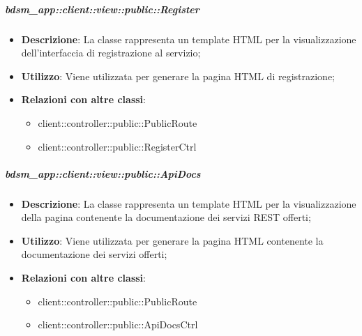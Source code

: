 		\subparagraph{bdsm\_app::client::view::public::Register} %
		\label{subp:bdsm_app_client_view_public_register}
			\begin{itemize}
				\item \textbf{Descrizione}: La classe rappresenta un template HTML per la visualizzazione dell'interfaccia di registrazione al servizio;
				\item \textbf{Utilizzo}: Viene utilizzata per generare la pagina HTML di registrazione;
				\item \textbf{Relazioni con altre classi}:
					\begin{itemize}
						\item client::controller::public::PublicRoute
						\item client::controller::public::RegisterCtrl
					\end{itemize}
			\end{itemize}

		\subparagraph{bdsm\_app::client::view::public::ApiDocs} %
		\label{subp:bdsm_app_client_view_public_apidocs}
			\begin{itemize}
				\item \textbf{Descrizione}: La classe rappresenta un template HTML per la visualizzazione della pagina contenente la documentazione dei servizi REST offerti;
				\item \textbf{Utilizzo}: Viene utilizzata per generare la pagina HTML contenente la documentazione dei servizi offerti;
				\item \textbf{Relazioni con altre classi}: 		
					\begin{itemize}
						\item client::controller::public::PublicRoute
						\item client::controller::public::ApiDocsCtrl
					\end{itemize}
			\end{itemize}



